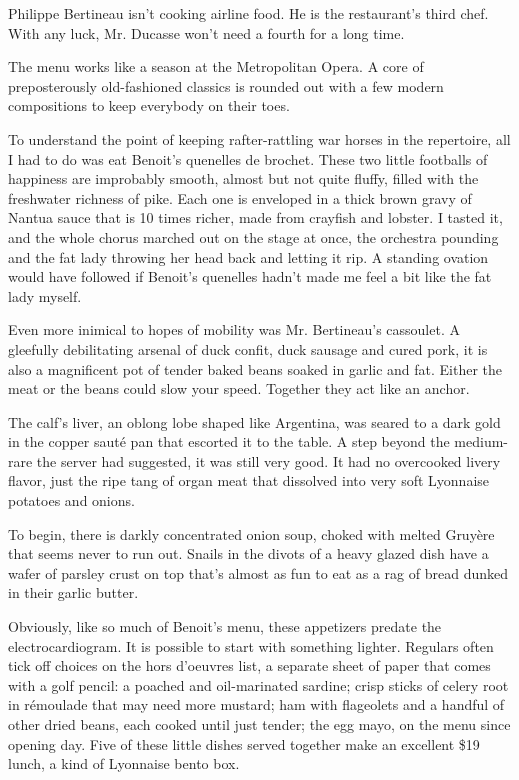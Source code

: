 Philippe Bertineau isn't cooking airline food. He is the restaurant's
third chef. With any luck, Mr. Ducasse won't need a fourth for a long
time.

The menu works like a season at the Metropolitan Opera. A core of
preposterously old-fashioned classics is rounded out with a few modern
compositions to keep everybody on their toes.

To understand the point of keeping rafter-rattling war horses in the
repertoire, all I had to do was eat Benoit's quenelles de brochet. These
two little footballs of happiness are improbably smooth, almost but not
quite fluffy, filled with the freshwater richness of pike. Each one is
enveloped in a thick brown gravy of Nantua sauce that is 10 times
richer, made from crayfish and lobster. I tasted it, and the whole
chorus marched out on the stage at once, the orchestra pounding and the
fat lady throwing her head back and letting it rip. A standing ovation
would have followed if Benoit's quenelles hadn't made me feel a bit like
the fat lady myself.

Even more inimical to hopes of mobility was Mr. Bertineau's cassoulet. A
gleefully debilitating arsenal of duck confit, duck sausage and cured
pork, it is also a magnificent pot of tender baked beans soaked in
garlic and fat. Either the meat or the beans could slow your speed.
Together they act like an anchor.

The calf's liver, an oblong lobe shaped like Argentina, was seared to a
dark gold in the copper sauté pan that escorted it to the table. A step
beyond the medium-rare the server had suggested, it was still very good.
It had no overcooked livery flavor, just the ripe tang of organ meat
that dissolved into very soft Lyonnaise potatoes and onions.

To begin, there is darkly concentrated onion soup, choked with melted
Gruyère that seems never to run out. Snails in the divots of a heavy
glazed dish have a wafer of parsley crust on top that's almost as fun to
eat as a rag of bread dunked in their garlic butter.

Obviously, like so much of Benoit's menu, these appetizers predate the
electrocardiogram. It is possible to start with something lighter.
Regulars often tick off choices on the hors d'oeuvres list, a separate
sheet of paper that comes with a golf pencil: a poached and
oil-marinated sardine; crisp sticks of celery root in rémoulade that may
need more mustard; ham with flageolets and a handful of other dried
beans, each cooked until just tender; the egg mayo, on the menu since
opening day. Five of these little dishes served together make an
excellent \$19 lunch, a kind of Lyonnaise bento box.

